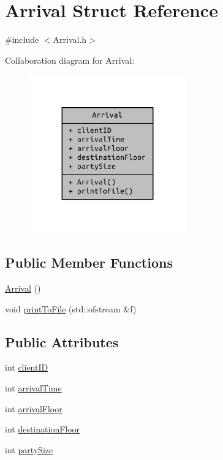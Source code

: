 \hypertarget{struct_arrival}{}\section{Arrival Struct Reference}
\label{struct_arrival}


{\ttfamily \#include $<$Arrival.\+h$>$}



Collaboration diagram for Arrival\+:
\nopagebreak
\begin{figure}[H]
\begin{center}
\leavevmode
\includegraphics[width=191pt]{struct_arrival__coll__graph}
\end{center}
\end{figure}
\subsection*{Public Member Functions}
\begin{DoxyCompactItemize}
\item 
\hyperlink{struct_arrival_a5efe81eda57821d5edb6e14aa579ae8f}{Arrival} ()
\item 
void \hyperlink{struct_arrival_aca93437b96931fb116bbdaa550e58b92}{print\+To\+File} (std\+::ofstream \&f)
\end{DoxyCompactItemize}
\subsection*{Public Attributes}
\begin{DoxyCompactItemize}
\item 
int \hyperlink{struct_arrival_ad125f5bf352f24c0f02fbd25833fcbe9}{client\+I\+D}
\item 
int \hyperlink{struct_arrival_a1604fbb65bfcc4c08cb2a4e31533dd15}{arrival\+Time}
\item 
int \hyperlink{struct_arrival_a7037c82fd4a17d0a08d81e716fa1de5b}{arrival\+Floor}
\item 
int \hyperlink{struct_arrival_ae3cbceb243227c0e74011dcb04176e2f}{destination\+Floor}
\item 
int \hyperlink{struct_arrival_a13cb78aefa91f18325ff068a2bd4ca93}{party\+Size}
\end{DoxyCompactItemize}


